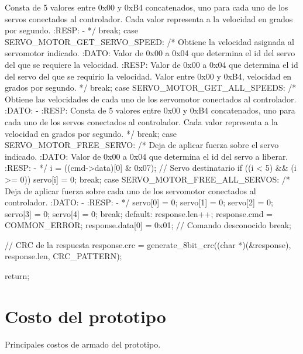 {\begin{verbatimtab}
{{			Consta de 5 valores entre 0x00 y 0xB4 concatenados, uno 
			para cada uno de los servos conectados al controlador. 
			Cada valor representa a la velocidad en grados por segundo.
			:RESP:
			-
			*/
		break;
 		case SERVO_MOTOR_GET_SERVO_SPEED:
			/* Obtiene la velocidad asignada al servomotor indicado.
			:DATO:
			Valor de 0x00 a 0x04 que determina el id del servo del que
			se requiere la velocidad.
			:RESP:
			Valor de 0x00 a 0x04 que determina el id del servo del que 
			se requirio la velocidad. Valor entre 0x00 y 0xB4, velocidad 
			en grados por segundo.
			*/
		break;
 		case SERVO_MOTOR_GET_ALL_SPEEDS:
			/* Obtiene las velocidades de cada uno de los servomotor 
			conectados al controlador.
			:DATO:
			-
			:RESP:
			Consta de 5 valores entre 0x00 y 0xB4 concatenados, uno para 
			cada uno de los servos conectados al controlador. Cada valor 
			representa a la velocidad en grados por segundo.
			*/
		break;
 		case SERVO_MOTOR_FREE_SERVO:
			/* Deja de aplicar fuerza sobre el servo indicado.
			:DATO:
			Valor de 0x00 a 0x04 que determina el id del servo a liberar.
			:RESP:
			-
			*/
			i = ((cmd->data)[0] & 0x07); // Servo destinatario
			if ((i < 5) && (i >= 0))
			{
				servo[i] = 0;
			}
		break;
 		case SERVO_MOTOR_FREE_ALL_SERVOS:
			/* Deja de aplicar fuerza sobre cada uno de los servomotor 
			conectados al controlador.
			:DATO:
			-
			:RESP:
			-
			*/
			servo[0] = 0;
			servo[1] = 0;
			servo[2] = 0;
			servo[3] = 0;
			servo[4] = 0;
		break;
		default:
			response.len++;
			response.cmd = COMMON_ERROR;
			response.data[0] = 0x01; // Comando desconocido
		break;
	}	

	// CRC de la respuesta
	response.crc = generate_8bit_crc((char *)(&response), response.len, CRC_PATTERN);

	return;
}
\end{verbatimtab}
}

\section{Costo del prototipo}
\label{hA_costo}

Principales costos de armado del prototipo.

